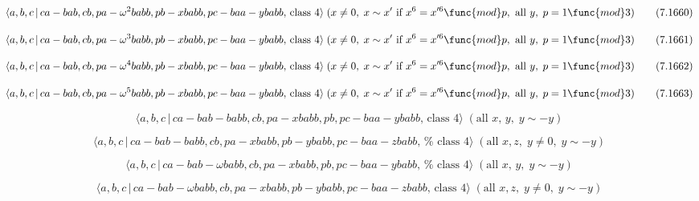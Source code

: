 \documentclass[10pt]{article}
\begin{document}
\begin{equation}
\langle a,b,c\,|\,ca-bab,cb,pa-\omega ^{2}babb,pb-xbabb,pc-baa-ybabb,\,\text{%
class }4\rangle \;(x\neq 0,\;x\sim x^{\prime }\text{ if }x^{6}=x^{\prime 6}%
\func{mod}p,\text{ all }y,\;p=1\func{mod}3)  \tag{7.1660}
\end{equation}

\begin{equation}
\langle a,b,c\,|\,ca-bab,cb,pa-\omega ^{3}babb,pb-xbabb,pc-baa-ybabb,\,\text{%
class }4\rangle \;(x\neq 0,\;x\sim x^{\prime }\text{ if }x^{6}=x^{\prime 6}%
\func{mod}p,\text{ all }y,\;p=1\func{mod}3)  \tag{7.1661}
\end{equation}

\begin{equation}
\langle a,b,c\,|\,ca-bab,cb,pa-\omega ^{4}babb,pb-xbabb,pc-baa-ybabb,\,\text{%
class }4\rangle \;(x\neq 0,\;x\sim x^{\prime }\text{ if }x^{6}=x^{\prime 6}%
\func{mod}p,\text{ all }y,\;p=1\func{mod}3)  \tag{7.1662}
\end{equation}

\begin{equation}
\langle a,b,c\,|\,ca-bab,cb,pa-\omega ^{5}babb,pb-xbabb,pc-baa-ybabb,\,\text{%
class }4\rangle \;(x\neq 0,\;x\sim x^{\prime }\text{ if }x^{6}=x^{\prime 6}%
\func{mod}p,\text{ all }y,\;p=1\func{mod}3)  \tag{7.1663}
\end{equation}

\begin{equation}
\langle a,b,c\,|\,ca-bab-babb,cb,pa-xbabb,pb,pc-baa-ybabb,\,\text{class }%
4\rangle \;(\text{all }x,\,y,\;y\sim -y)  \tag{7.1664}
\end{equation}

\begin{equation}
\langle a,b,c\,|\,ca-bab-babb,cb,pa-xbabb,pb-ybabb,pc-baa-zbabb,\,\text{%
class }4\rangle \;(\text{all }x,z,\;y\neq 0,\;y\sim -y)  \tag{7.1665}
\end{equation}

\begin{equation}
\langle a,b,c\,|\,ca-bab-\omega babb,cb,pa-xbabb,pb,pc-baa-ybabb,\,\text{%
class }4\rangle \;(\text{all }x,\,y,\;y\sim -y)  \tag{7.1666}
\end{equation}

\begin{equation}
\langle a,b,c\,|\,ca-bab-\omega babb,cb,pa-xbabb,pb-ybabb,pc-baa-zbabb,\,%
\text{class }4\rangle \;(\text{all }x,z,\;y\neq 0,\;y\sim -y)  \tag{7.1667}
\end{equation}
\end{document}
